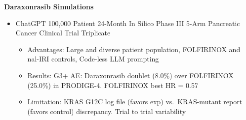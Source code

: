 \documentclass{article}
\begin{document}
\raggedright \textbf{Daraxonrasib Simulations} \cite{16KawchakPaper, 17KawchakPaper, 18KawchakPaper}
\vspace{-0.1em}
\begin{itemize}[leftmargin=2.5em, itemsep=0em, topsep=-0em]
    \item[1)] \fontsize{9.5pt}{10.5pt}\selectfont ChatGPT 100,000 Patient 24-Month In Silico Phase III 5-Arm Pancreatic Cancer Clinical Trial Triplicate \
    \begin{itemize} [leftmargin=1em, itemsep=0em, topsep=-0.08em] \fontsize{9.5pt}{10.5pt}\selectfont
    \item[\raisebox{0.25ex}{\scalebox{0.7}{$\bullet$}}] Advantages: Large and diverse patient population, FOLFIRINOX \cite{Folfirinox} and nal-IRI \cite{Napoli1} controls, Code-less LLM prompting
    \item[\raisebox{0.25ex}{\scalebox{0.7}{$\bullet$}}] Results: G3+ AE: Daraxonrasib doublet (8.0\%) over FOLFIRINOX (25.0\%) in PRODIGE-4. FOLFIRINOX best HR = 0.57
    \item[\raisebox{0.25ex}{\scalebox{0.7}{$\bullet$}}] Limitation: KRAS G12C log file (favors exp) vs.\ KRAS-mutant report (favors control) discrepancy. Trial to trial variability 
    \end{itemize}
    \end{itemize}
\end{document}
